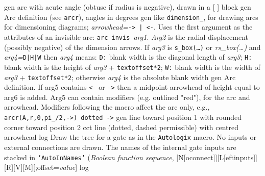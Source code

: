   {gen}
  {arc with acute angle (obtuse if radius is negative), drawn in a [ ] block}
  {gen}
  {Arc definition (see {\tt arcr}), angles in degrees
    }
  {gen}
  {like {\tt dimension\_}, for drawing arcs for dimensioning diagrams;
      {\sl arrowhead=}{\tt -> | <-}. Uses the first argument as the attributes
      of an invisible arc: {\tt arc invis }{\sl arg1}.  {\sl Arg2} is the
      radial displacement (possibly negative) of the dimension arrows.
      If {\sl arg3} is {\tt s\_box(\ldots)} or {\sl rs\_box(\ldots)} and
      {\sl arg4=}{\tt D|H|W} then {\sl arg4} means:
      {\tt D:} blank width is the diagonal length of {\sl arg3};
      {\tt H:} blank width is the height of {\sl arg3} + {\tt textoffset*2};
      {\tt W:} blank width is the width of {\sl arg3} + {\tt textoffset*2};
      otherwise {\sl arg4} is the absolute blank width}
  {gen}
  {Arc definition.  If arg5 contains {\tt <-} or {\tt ->} then a midpoint
    arrowhead of height equal to arg6 is added. Arg5 can contain modifiers
    (e.g. outlined "red"), for the arc and arrowhead.  Modifiers following
    the macro affect the arc only,
    e.g., {\tt arcr(A,r,0,pi\_/2,->) dotted ->}
   }
  {gen}
  {line toward position 1 with rounded corner toward position 2}
  {cct}
  {line (dotted, dashed permissible) with centred arrowhead
    }
  {log}
  {Draw the tree for a gate as in the {\tt Autologix} macro.  No inputs
   or external connections are drawn.  The names of the internal gate
   inputs are stacked in {\tt `AutoInNames'}}
%
 {({\sl Boolean function sequence},%
    [N[oconnect]][L[eftinputs]][R][V][M][;offset={\sl value}]}
  {log}

